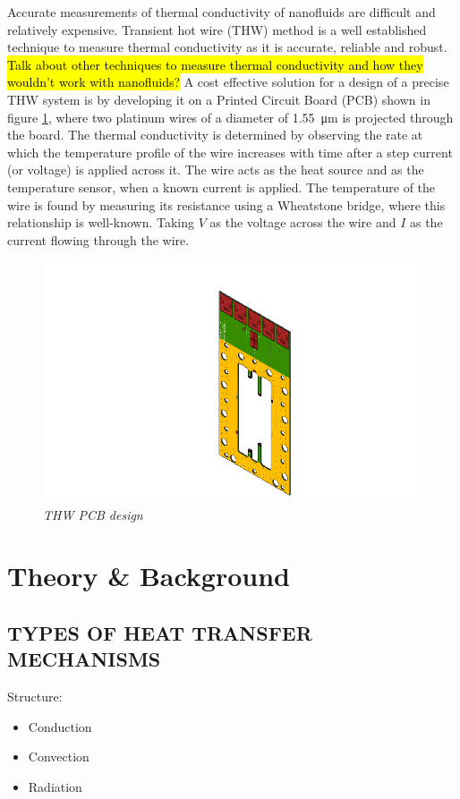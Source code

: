 \documentclass{article}
\begin{document}
Accurate measurements of thermal conductivity of nanofluids are difficult and relatively expensive. Transient hot wire (THW) method is a well established technique to measure thermal conductivity as it is accurate, reliable and robust. \hl{Talk about other techniques to measure thermal conductivity and how they wouldn't work with nanofluids?} A cost effective solution for a design of a precise THW system is by developing it on a Printed Circuit Board (PCB) shown in figure \ref{fig:pcbdesign}, where two platinum wires of a diameter of \SI{1.55}{\micro\metre} is projected through the board. The thermal conductivity is determined by observing the rate at which the temperature profile of the wire increases with time after a step current (or voltage) is applied across it. The wire acts as the heat source and as the temperature sensor, when a known current is applied. The temperature of the wire is found by measuring its resistance using a Wheatstone bridge, where this relationship is well-known.
Taking $ V $ as the voltage across the wire and $ I $ as the current flowing through the wire.

	
	\begin{figure}[h] 
		\centering
		\includegraphics[scale=0.4]{PCBdesign}
		\caption{\textit{THW PCB design}}
		\label{fig:pcbdesign}
	\end{figure}

\newpage
\section{Theory \& Background}
	\subsection{TYPES OF HEAT TRANSFER MECHANISMS}
	Structure:
	\begin{itemize}
		\item Conduction
		\item Convection
		\item Radiation
	\end{itemize}
\end{document}

